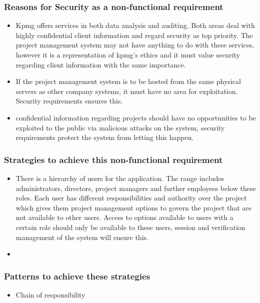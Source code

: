 \documentclass[]{article}
\begin{document}
    \subsubsection{Reasons for Security as a non-functional requirement}
    \begin{itemize}
        \item Kpmg offers services in both data analysis and auditing. Both areas deal with highly confidential client information and regard security as top priority. The project management system may not have anything to do with these services, however it is a representation of kpmg's ethics and it must value security regarding client information with the same importance.
        
        \item If the project management system is to be hosted from the same physical servers as other company systems, it must have no area for exploitation. Security requirements ensures this.
        
        \item confidential information regarding projects should have no opportunities to be exploited to the public via malicious attacks on the system, security requirements protect the system from letting this happen.  
    \end{itemize}
    
    \subsubsection{Strategies to achieve this non-functional requirement}
    \begin{itemize}
        \item There is a hierarchy of users for the application. The range includes administrators, directors, project managers and further employees below these roles. Each user has different responsibilities and authority over the project which gives them project management options to govern the project that are not available to other users. Access to options available to users with a certain role should only be available to these users, session and verification management of the system will ensure this.
        
        \item 
    \end{itemize}
    
    \subsubsection{Patterns to achieve these strategies}
    \begin{itemize}
    \item Chain of responsibility
    \end{itemize}
    
\end{document}
